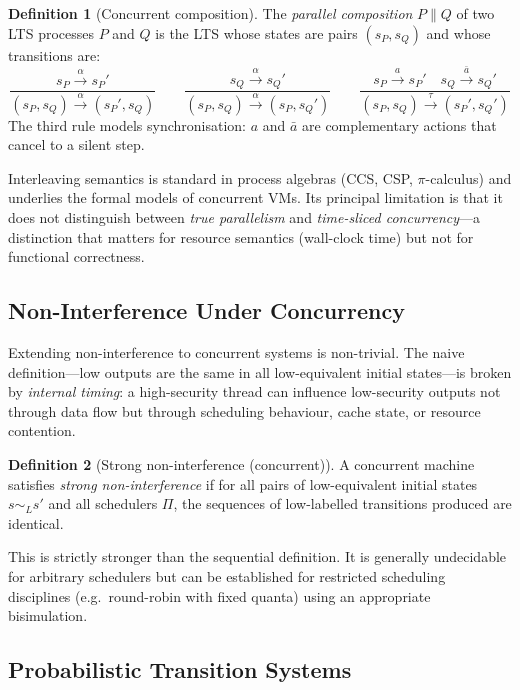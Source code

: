 \documentclass[11pt, a4paper]{article}
\theoremstyle{definition}
\newtheorem{definition}{Definition}[section]
\theoremstyle{plain}
\theoremstyle{remark}
\begin{document}
\begin{definition}[Concurrent composition]
  The \emph{parallel composition} $P \parallel Q$ of two LTS processes
  $P$ and $Q$ is the LTS whose states are pairs $(s_P, s_Q)$ and whose
  transitions are:
  \[
    \frac{s_P \xrightarrow{\alpha} s_P'}{(s_P, s_Q)
      \xrightarrow{\alpha} (s_P', s_Q)}
    \qquad
    \frac{s_Q \xrightarrow{\alpha} s_Q'}{(s_P, s_Q)
      \xrightarrow{\alpha} (s_P, s_Q')}
    \qquad
    \frac{s_P \xrightarrow{a} s_P' \quad s_Q \xrightarrow{\bar{a}} s_Q'}
         {(s_P, s_Q) \xrightarrow{\tau} (s_P', s_Q')}
  \]
  The third rule models synchronisation: $a$ and $\bar{a}$ are
  complementary actions that cancel to a silent step.
\end{definition}

Interleaving semantics is standard in process algebras (CCS, CSP,
$\pi$-calculus) and underlies the formal models of concurrent VMs. Its
principal limitation is that it does not distinguish between
\emph{true parallelism} and \emph{time-sliced concurrency}---a
distinction that matters for resource semantics (wall-clock time) but
not for functional correctness.

\subsection{Non-Interference Under Concurrency}

Extending non-interference to concurrent systems is non-trivial. The naive
definition---low outputs are the same in all low-equivalent initial states---is
broken by \emph{internal timing}: a high-security thread can influence
low-security outputs not through data flow but through scheduling behaviour,
cache state, or resource contention.

\begin{definition}[Strong non-interference (concurrent)]
  A concurrent machine satisfies \emph{strong non-interference} if for all
  pairs of low-equivalent initial states $s \sim_L s'$ and all schedulers
  $\Pi$, the sequences of low-labelled transitions produced are identical.
\end{definition}

This is strictly stronger than the sequential definition. It is generally
undecidable for arbitrary schedulers but can be established for restricted
scheduling disciplines (e.g.\ round-robin with fixed quanta) using an
appropriate bisimulation.

\subsection{Probabilistic Transition Systems}
\end{document}
